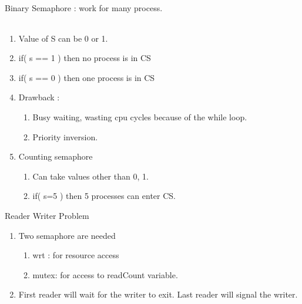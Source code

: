 \begin{enumerate}
 \begin{minipage}{\linewidth}
  \item Binary Semaphore : work for many process. \\
      \begin{myTableStyle}
        \begin{tabular}{ |m{4.5cm}|m{5cm}|m{3.5cm}| } \hline
               &
             &
             \\ \hline
        \end{tabular}
      \end{myTableStyle}
      \vspace{0.08in}
  \begin{enumerate}
    \item Value of S can be 0 or 1.
    \item if( s == 1 ) then no   process is in CS
    \item if( s == 0 ) then one process is in CS
    \item Drawback :
    \begin{enumerate}
      \item Busy waiting, wasting cpu cycles because of the while loop.
      \item Priority inversion.
  \end{enumerate}
  \item Counting semaphore
  \begin{enumerate}
    \item Can take values other than 0, 1.
    \item if( s=5 ) then 5 processes can enter CS.
  \end{enumerate}
  \end{enumerate}
  \end{minipage}
  \vspace{0.08in}

  \item Reader Writer Problem
  \begin{enumerate}
    \item Two semaphore are needed
      \begin{enumerate}
        \item wrt : for resource access
        \item mutex: for access to readCount variable.
      \end{enumerate}
    \item First reader will wait for the writer to exit. Last reader will signal the writer.
  \end{enumerate}




\end{enumerate}

